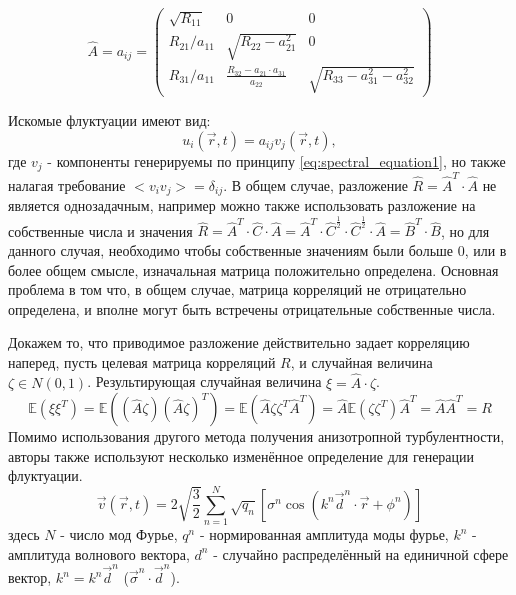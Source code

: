 \begin{equation}
    \label{eq:spectral_equation18_3}
     \hat{A} = a_{ij} = \begin{pmatrix}
                            \sqrt{R_{11}} & 0 & 0 \\
                            R_{21} / a_{11} & \sqrt{R_{22} - a_{21}^2} & 0 \\
                            R_{31} / a_{11} & \frac{R_{32} - a_{21} \cdot a_{31}}{a_22} & \sqrt{R_{33} - a_{31}^2 - a_{32}^2}
                        \end{pmatrix}
\end{equation}

Искомые флуктуации имеют вид:
\begin{equation}
    \label{eq:spectral_equation19}
    u_i(\vec r, t) = a_{ij} v_j(\vec r, t),
\end{equation}
\noindent
где $v_j$ - компоненты генерируемы по принципу \eqref{eq:spectral_equation1}, но также налагая требование $<v_i v_j> = \delta_{ij}$. В общем случае, разложение $\hat{R} = \hat{A}^T \cdot \hat{A}$ не является однозадачным, например можно также использовать разложение на собственные числа и значения $\hat{R} = \hat{A}^T \cdot \hat{C} \cdot \hat{A} = \hat{A}^T \cdot \hat{C}^{\frac{1}{2}} \cdot \hat{C}^{\frac{1}{2}} \cdot \hat{A} = \hat{B}^T \cdot \hat{B}$, но для данного случая, необходимо чтобы собственные значениям были больше 0, или в более общем смысле, изначальная матрица положительно определена. Основная проблема в том что, в общем случае, матрица корреляций не отрицательно определена, и вполне могут быть встречены отрицательные собственные числа. 

Докажем то, что приводимое разложение действительно задает корреляцию наперед, пусть целевая матрица корреляций $R$, и случайная величина $\zeta \in N(0, 1)$. Результирующая случайная величина $\xi = \hat{A} \cdot \zeta$. 
\begin{equation}
    \label{eq:spectral_equation19_1}
    \mathbb{E} \left(\xi \xi^T\right) = \mathbb{E} \left((\hat{A} \zeta)(\hat{A} \zeta)^T \right) = \mathbb{E} \left(\hat{A} \zeta \zeta^T \hat{A}^T\right) = \hat{A} \mathbb{E} \left(\zeta \zeta^T \right) \hat{A}^T = \hat{A} \hat{A}^T = R
\end{equation}
Помимо использования другого метода получения анизотропной турбулентности, авторы также используют несколько изменённое определение для генерации флуктуации. 
\begin{equation}
    \label{eq:spectral_equation20}
    \vec{v}(\vec r, t) = 2 \sqrt{\dfrac{3}{2}} \sum_{n=1}^N \sqrt{q_n} \left[ \sigma^n \cos{(k^n \vec{d}^n \cdot 
    \vec r + \phi^n)} \right]
\end{equation}
здесь $N$ - число мод Фурье, $q^n$ - нормированная амплитуда моды фурье, $k^n$ - амплитуда волнового вектора, $d^n$ - случайно распределённый на единичной сфере вектор, $k^n = k^n \vec d^n$ ($\vec \sigma^n \cdot \vec d^n$). 

